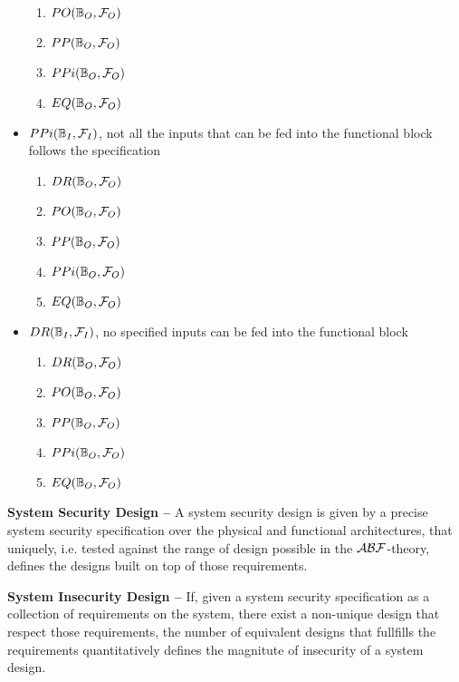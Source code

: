 \begin{itemize}
\begin{enumerate}[start=58, label={W\arabic*)}]
		\item $PO(\mathbb{B}_O,\mathcal{F}_O)$
		\item $PP(\mathbb{B}_O,\mathcal{F}_O)$
		\item $PPi(\mathbb{B}_O,\mathcal{F}_O)$
		\item $EQ(\mathbb{B}_O,\mathcal{F}_O)$
	\end{enumerate}
	\item $PPi(\mathbb{B}_I,\mathcal{F}_I)$, not all the inputs that
		can be fed into the functional block follows the specification
	\begin{enumerate}[start=63, label={W\arabic*)}]
		\item $DR(\mathbb{B}_O,\mathcal{F}_O)$
		\item $PO(\mathbb{B}_O,\mathcal{F}_O)$
		\item $PP(\mathbb{B}_O,\mathcal{F}_O)$
		\item $PPi(\mathbb{B}_O,\mathcal{F}_O)$
		\item $EQ(\mathbb{B}_O,\mathcal{F}_O)$
	\end{enumerate}
	\item $DR(\mathbb{B}_I,\mathcal{F}_I)$, no specified inputs can be
		fed into the functional block
	\begin{enumerate}[start=68, label={W\arabic*)}]
		\item $DR(\mathbb{B}_O,\mathcal{F}_O)$
		\item $PO(\mathbb{B}_O,\mathcal{F}_O)$
		\item $PP(\mathbb{B}_O,\mathcal{F}_O)$
		\item $PPi(\mathbb{B}_O,\mathcal{F}_O)$
		\item $EQ(\mathbb{B}_O,\mathcal{F}_O)$
	\end{enumerate}
\end{itemize}

\begin{hypothesis}{\bf System Security Design --}\label{hyp:security}
	A system security design is given by a precise system security
	specification over the physical and functional architectures, that
	uniquely, i.e.  tested against the range of design possible in the
	$\mathcal{A}\mathcal{B}\mathcal{F}$-theory, defines the designs built on top of those
	requirements.
\end{hypothesis}

\begin{hypothesis}{\bf System Insecurity Design --}\label{hyp:insecurity}
	If, given a system security specification as a collection of
	requirements on the system, there exist
	a non-unique design that respect those requirements, the number of
	equivalent designs that fullfills the requirements quantitatively
	defines the magnitute of insecurity of a system design.
\end{hypothesis}

